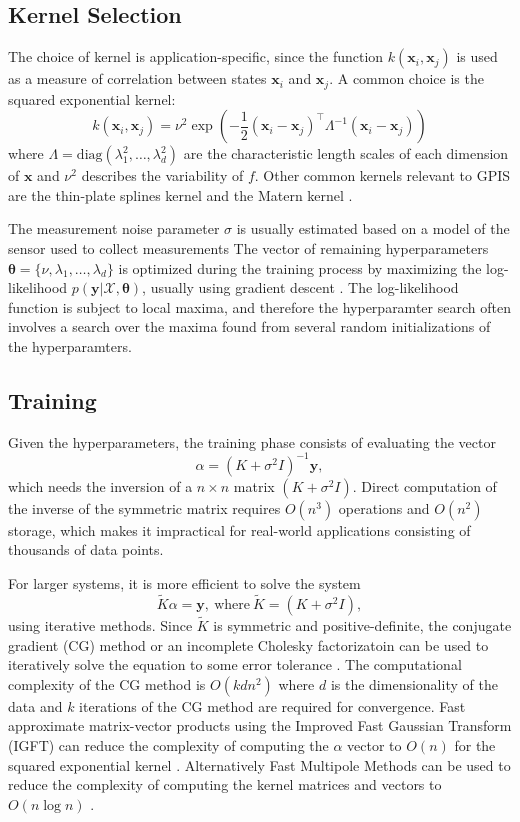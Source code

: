 \documentclass[letterpaper, 10 pt, conference]{ieeeconf}  %
\newcommand{\by}{\mathbf{y}}
\newcommand{\bx}{\mathbf{x}}
\newcommand{\mX}{\mathcal{X}}
\begin{document}
\subsection{Kernel Selection}
The choice of kernel is application-specific, since the function $k(\bx_i,\bx_j)$ is used as a measure of correlation between states $\bx_i$ and $\bx_j$. A common choice is the squared exponential kernel:
\begin{equation}
	k(\bx_i,\bx_j) = \nu^2\exp(-\frac{1}{2}(\bx_i - \bx_j)^{\intercal}\Lambda^{-1}(\bx_i - \bx_j))
\end{equation}
where $\Lambda= \text{diag}(\lambda_1^2,\ldots,\lambda_d^2)$ are the characteristic length scales of each dimension of $\bx$ and $\nu^2$ describes the variability of $f$.
Other common kernels relevant to GPIS are the thin-plate splines kernel \cite{williams2007} and the Matern kernel \cite{bjorkman2013enhancing}.

The measurement noise parameter $\sigma$ is usually estimated based on a model of the sensor used to collect measurements
The vector of remaining hyperparameters $\boldsymbol{\theta} = \{\nu, \lambda_1,\ldots,\lambda_d\}$ is optimized during the training process by maximizing the log-likelihood $p(\by|\mX,\boldsymbol{\theta})$, usually using gradient descent \cite{rasmussen2006gaussian}.
The log-likelihood function is subject to local maxima, and therefore the hyperparamter search often involves a search over the maxima found from several random initializations of the hyperparamters.

\subsection{Training}
Given the hyperparameters, the training phase consists of evaluating the vector 
\begin{equation}
\alpha = (K + \sigma^2 I)^{-1}\by,
\end{equation}
which needs the inversion of a $n \times n$ matrix $(K + \sigma^2I)$. Direct computation of the inverse of the symmetric matrix requires $O(n^3)$ operations and $O(n^2)$ storage, which makes it impractical for real-world applications consisting of thousands of data points.

For larger systems, it is more efficient to solve the system
\begin{equation}
	\tilde{K}\alpha = \by, ~\text{where} ~\tilde{K} = (K + \sigma^2I),
\end{equation}
using iterative methods. Since $\tilde{K}$ is symmetric and positive-definite, the conjugate gradient (CG) method or an incomplete Cholesky factorizatoin can be used to iteratively solve the equation to some error tolerance \cite{gibbs1997}.
The computational complexity of the CG method is $O(kdn^2)$ where $d$ is the dimensionality of the data and $k$ iterations of the CG method are required for convergence.
Fast approximate matrix-vector products using the Improved Fast Gaussian Transform (IGFT) can reduce the complexity of computing the $\alpha$ vector to $O(n)$ for the squared exponential kernel \cite{raykar2007}.
Alternatively Fast Multipole Methods can be used to reduce the complexity of computing the kernel matrices and vectors to $O(n \log n)$ \cite{gumerov2005fast}.
\end{document}
